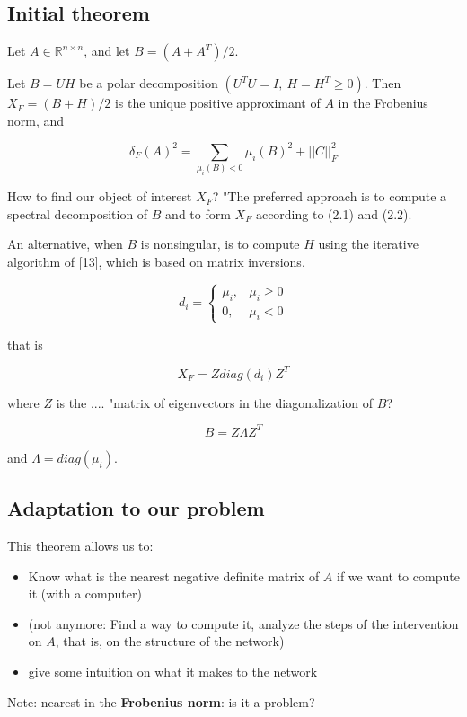 \documentclass[12pt]{article}
\begin{document}
\subsection{Initial theorem}

Let $A \in \mathbb{R}^{n \times n}$, and let $B = (A + A^T)/2$.

Let $B=UH$ be a polar decomposition $(U^T U = I, \ H = H^T \geq 0)$. Then $X_F = (B+H)/2$ is the unique positive approximant of $A$ in the Frobenius norm, and 

\[ \delta_F(A)^2 = \sum_{\mu_i(B)<0} \mu_i(B)^2 + ||C||_F^2 \]

How to find our object of interest $X_F$? "The preferred approach is to compute a spectral decomposition of $B$ and to form $X_F$ according to (2.1) and (2.2).

An alternative, when $B$ is nonsingular, is to compute $H$ using the iterative algorithm of [13], which is based on matrix inversions.



\[ d_i = \left\{ \begin{array}{ll} 
\mu_i, & \mu_i \geq 0 \\
0, & \mu_i<0 \end{array} \right.
\tag{2.1} \]

that is

\[ X_F = Z diag(d_i) Z^T \tag{2.2} \]

where $Z$ is the .... "matrix of eigenvectors in the diagonalization of $B$?

\[ B = Z \Lambda Z^T \]

and $\Lambda=diag(\mu_i)$.

\subsection{Adaptation to our problem}

This theorem allows us to:
\begin{itemize}[noitemsep,topsep=0pt]
  \item Know what is the nearest negative definite matrix of $A$ if we want to compute it (with a computer)
  \item (not anymore: Find a way to compute it, analyze the steps of the intervention on $A$, that is, on the structure of the network)
\item give some intuition on what it makes to the network
 \end{itemize}

Note: nearest in the \textbf{Frobenius norm}: is it a problem?
\end{document}
